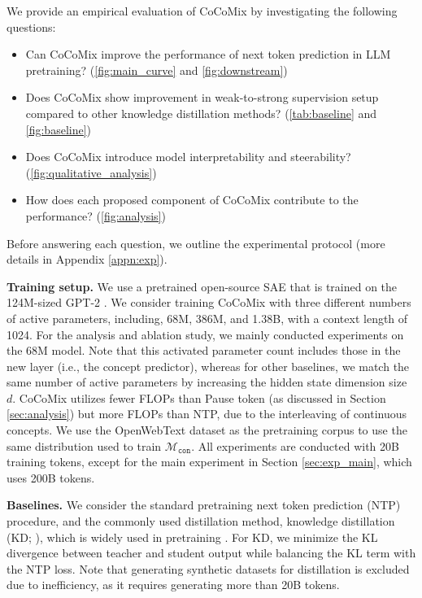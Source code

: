 \documentclass[]{fairmeta}
\newcommand{\sname}{CoCoMix\xspace}
\begin{document}
We provide an empirical evaluation of \sname by investigating the following questions:
\begin{itemize}[leftmargin=*,topsep=0.0pt,itemsep=.5pt]
\item Can \sname improve the performance of next token prediction in LLM pretraining? (\autoref{fig:main_curve} and \autoref{fig:downstream})
\item Does \sname show improvement in weak-to-strong supervision setup compared to other knowledge distillation methods? (\autoref{tab:baseline} and \autoref{fig:baseline})
\item Does \sname introduce model interpretability and steerability? (\autoref{fig:qualitative_analysis})
\item How does each proposed component of \sname contribute to the performance? (\autoref{fig:analysis})
\end{itemize}

Before answering each question, we outline the experimental protocol (more details in Appendix \ref{appn:exp}). 

\textbf{Training setup.} We use a pretrained open-source SAE that is trained on the 124M-sized GPT-2  \citep{gao2024scaling}. We consider training \sname with three different numbers of active parameters, including, 68M, 386M, and 1.38B, with a context length of 1024. For the analysis and ablation study, we mainly conducted experiments on the 68M model. Note that this activated parameter count includes those in the new layer (i.e., the concept predictor), whereas for other baselines, we match the same number of active parameters by increasing the hidden state dimension size $d$. \sname utilizes fewer FLOPs than Pause token (as discussed in Section \ref{sec:analysis}) but more FLOPs than NTP, due to the interleaving of continuous concepts. We use the OpenWebText dataset \citep{radford2019language} as the pretraining corpus to use the same distribution used to train $\mathcal{M}_{\mathtt{con}}$. All experiments are conducted with 20B training tokens, except for the main experiment in Section \ref{sec:exp_main}, which uses 200B tokens.

\textbf{Baselines.} We consider the standard pretraining next token prediction (NTP) procedure, and the commonly used distillation method, knowledge distillation (KD; \citealp{hinton2015distilling}), which is widely used in pretraining \citep{gu2024miniplm, sanh2019distilbert,team2024gemma}. For KD, we minimize the KL divergence between teacher and student output while balancing the KL term with the NTP loss. Note that generating synthetic datasets for distillation \citep{kim2016sequence,yu2024distilling} is excluded due to inefficiency, as it requires generating more than 20B tokens. 
\end{document}
